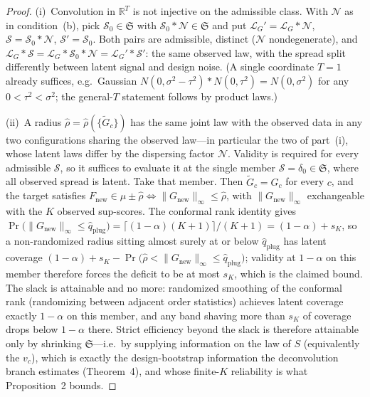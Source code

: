 \documentclass[12pt]{article}
\theoremstyle{definition}
\theoremstyle{remark}
\newcommand{\Gtilde}{\widetilde{G}}
\begin{document}
\begin{proof}
(i)~Convolution in $\mathbb R^T$ is not injective on the admissible class.
With $\mathcal N$ as in condition~(b), pick $\mathcal S_0\in\mathfrak S$ with
$\mathcal S_0*\mathcal N\in\mathfrak S$ and put
$\mathcal L_G'=\mathcal L_G*\mathcal N$, $\mathcal S=\mathcal S_0*\mathcal N$,
$\mathcal S'=\mathcal S_0$. Both pairs are admissible, distinct
($\mathcal N$ nondegenerate), and
$\mathcal L_G*\mathcal S=\mathcal L_G*\mathcal S_0*\mathcal N
=\mathcal L_G'*\mathcal S'$: the same observed law, with the spread split
differently between latent signal and design noise. (A single coordinate
$T{=}1$ already suffices, e.g.\ Gaussian
$N(0,\sigma^2-\tau^2)*N(0,\tau^2)=N(0,\sigma^2)$ for any $0<\tau^2<\sigma^2$;
the general-$T$ statement follows by product laws.)

(ii)~A radius $\widehat\rho=\widehat\rho(\{\Gtilde_c\})$ has the same
joint law with the observed data in any two configurations sharing the
observed law---in particular the two of part~(i), whose latent laws differ by
the dispersing factor $\mathcal N$. Validity is required for every admissible $\mathcal S$, so it suffices to
evaluate it at the single member $\mathcal S=\delta_0\in\mathfrak S$, where
all observed spread is latent. Take that member. Then $\Gtilde_c=G_c$ for every $c$,
and the target satisfies $F_{\text{new}}\in\mu\pm\widehat\rho\iff
\lVert G_{\text{new}}\rVert_\infty\le\widehat\rho$, with
$\lVert G_{\text{new}}\rVert_\infty$ exchangeable with the $K$ observed
sup-scores. The conformal rank identity gives
$\Pr\big(\lVert G_{\text{new}}\rVert_\infty\le\widehat q_{\text{plug}}\big)=
\lceil(1-\alpha)(K{+}1)\rceil/(K{+}1)=(1-\alpha)+s_K$, so a non-randomized
radius sitting almost surely at or below $\widehat q_{\text{plug}}$ has latent
coverage
$(1-\alpha)+s_K-
\Pr\big(\widehat\rho<\lVert G_{\text{new}}\rVert_\infty\le
\widehat q_{\text{plug}}\big)$; validity at $1-\alpha$ on this member
therefore forces the deficit to be at most $s_K$, which is the claimed bound.
The slack is attainable and no more: randomized smoothing of the conformal
rank (randomizing between adjacent order statistics) achieves latent coverage
exactly $1-\alpha$ on this member, and any band shaving more than $s_K$ of
coverage drops below $1-\alpha$ there. Strict efficiency beyond the slack is therefore
attainable only by shrinking $\mathfrak S$---i.e.\ by supplying information on
the law of $S$ (equivalently the $v_c$), which is exactly the design-bootstrap
information the deconvolution branch estimates (Theorem~4), and whose
finite-$K$ reliability is what Proposition~2 bounds.
\end{proof}
\end{document}
